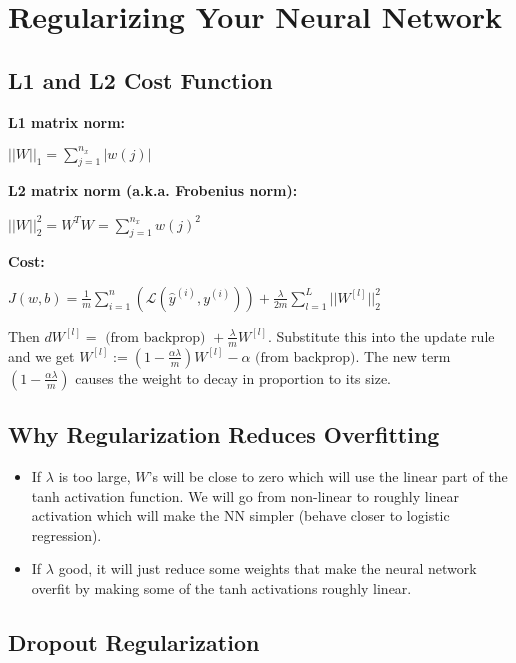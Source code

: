 \section{Regularizing Your Neural Network}

\subsection{L1 and L2 Cost Function}

\textbf{L1 matrix norm:}

$||W||_1 = \sum_{j=1}^{n_x} |w(j)|$

\textbf{L2 matrix norm (a.k.a. Frobenius norm):}

$||W||_2^2 = W^T W =  \sum_{j=1}^{n_x} w(j)^2$

\textbf{Cost:}

$J(w,b) = \frac{1}{m} \sum_{i=1}^{n} (\mathcal{L}(\hat{y}^{(i)},y^{(i)})) + \frac{\lambda}{2m} \sum_{l=1}^{L} ||W^{[l]}||_2^2$

Then $dW^{[l]} = \text{ (from backprop) } + \frac{\lambda}{m} W^{[l]}$. Substitute this into the update rule and we get $W^{[l]} := (1 - \frac{\alpha \lambda}{m}) W^{[l]} - \alpha \text{ (from backprop)}$. The new term $(1 - \frac{\alpha \lambda}{m})$ causes the weight to decay in proportion to its size.

\subsection{Why Regularization Reduces Overfitting}

\begin{itemize}[wide, labelwidth=!, labelindent=0pt]
\itemsep0em 
    \item If $\lambda$ is too large, $W$'s will be close to zero which will use the linear part of the tanh activation function. We will go from non-linear to roughly linear activation which will make the NN simpler (behave closer to logistic regression).
    \item If $\lambda$ good, it will just reduce some weights that make the neural network overfit by making some of the tanh activations roughly linear. \vspace*{-\baselineskip}
\end{itemize}

\subsection{Dropout Regularization}


